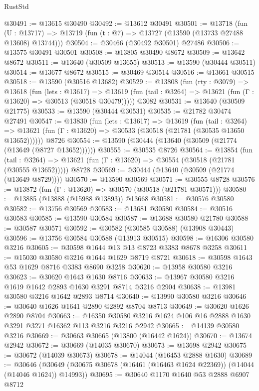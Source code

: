 \begin{lexlean}{RustStd}
\begin{coremodule}
@30491 := @13615 @30490
@30492 := @13612 @30491
@30501 := @13718
    (fun (U : @13717) => @13719 (fun (t : @7) => @13727 (@13590 (@13733 @27488 @13608) @13744)))
@30504 := @30466 (@30492 @30501) @27486
@30506 := @13575 @30491 @30501
@30508 := @13805 @30490 @8672
@30509 := @13642 @8672
@30511 := @13640 (@30509 @13655)
@30513 := @13590 (@30444 @30511)
@30514 := @13677 @8672
@30515 := @30469 @30514
@30516 := @13661 @30515
@30518 := @13590 (@30516 @13682)
@30529 := @13808
    (fun (rty : @3079) =>
    @13618
      (fun (lets : @13617) =>
      @13619 (fun (tail : @3264) => @13621 (fun (Γ : @13620) => @30513 (@30518 @30479)))))
    @3082
@30531 := @13640 (@30509 @21775)
@30533 := @13590 (@30444 @30531)
@30535 := @21782 @30474 @27491
@30547 := @13830
    (fun (lets : @13617) =>
    @13619
      (fun (tail : @3264) =>
      @13621 (fun (Γ : @13620) => @30533 (@30518 (@21781 (@30535 @13650 @13652))))))
    @8726
@30554 := @13590 (@30444 (@13640 (@30509 (@21774 (@13649 (@8727 @13652))))))
@30555 := @30535 @8726
@30564 := @13854
    (fun (tail : @3264) => @13621 (fun (Γ : @13620) => @30554 (@30518 (@21781 (@30555 @13652)))))
    @8728
@30569 := @30444 (@13640 (@30509 (@21774 (@13649 @8729))))
@30570 := @13590 @30569
@30571 := @30555 @8728
@30576 := @13872 (fun (Γ : @13620) => @30570 (@30518 (@21781 @30571)))
@30580 := @13885 (@13888 (@15988 @13893)) @13668
@30581 := @30576 @30580
@30582 := @13756 @30569
@30583 := @13681 @30580
@30584 := @30516 @30583
@30585 := @13590 @30584
@30587 := @13688 @30580 @21780
@30588 := @30587 @30571
@30592 := @30582 (@30585 @30588) (@13908 @30443)
@30596 := @13756 @30584 @30588 (@13913 @30515)
@30598 := @16306 @30580 @3216
@30605 := @30598 @1644 @13 @13 @8723 @3383 @8678 @3258
@30611 := @15030 @30580 @3216 @1644 @1629 @8719 @8721
@30618 := @30598 @1643 @53 @1629 @8716 @3383 @8690 @3258
@30620 := @13958 @30580 @3216
@30623 := @30620 @1643 @1630 @8716
@30633 := @13967 @30580 @3216 @1619 @1642 @2893 @1630 @3291 @8714 @3216 @2904
@30638 := @13981 @30580 @3216 @1642 @2893 @8714
@30640 := @13990 @30580 @3216
@30646 := @30640 @1626 @1641 @2890 @2892 @8704 @8713
@30649 := @30620 @1626 @2890 @8704
@30663 := @16350 @30580 @3216 @1624 @106 @16 @2888 @1630 @3291 @3271 @16362 @113 @3216 @3216 @2942
@30665 := @14139 @30580 @3216
@30669 := @30663 @30665 (@13800 (@16442 @1624))
@30670 := @13674 @2942
@30672 := @30669 (@14035 @30670)
@30673 := @13698 @2942
@30675 := @30672 (@14039 @30673)
@30678 := @14044 (@16453 @2888 @1630)
@30689 := @30646
    (@30649 (@30675 @30678 (@16461 (@16463 @1624 @22369)) (@14044 (@14046 @1624)) @14993))
@30695 := @30640 @1170 @1640 @53 @2888 @6907 @8712

\end{coremodule}
\end{lexlean}
